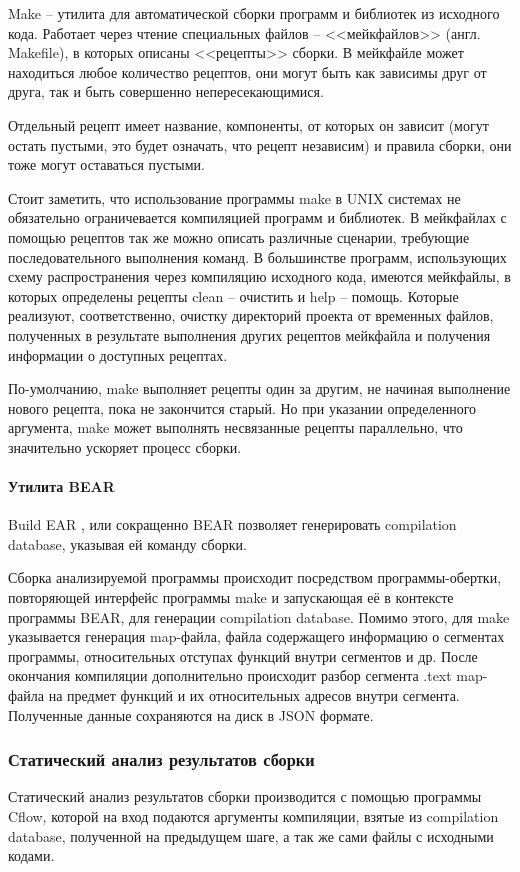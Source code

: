 Make -- утилита для автоматической сборки программ и библиотек из исходного кода.
Работает через чтение специальных файлов -- <<мейкфайлов>> (англ. Makefile), в которых 
описаны <<рецепты>> сборки. В мейкфайле может находиться любое количество рецептов, они могут
быть как зависимы друг от друга, так и быть совершенно непересекающимися.

Отдельный рецепт имеет название, компоненты, от которых он зависит (могут остать пустыми, это будет означать,
что рецепт независим) и правила сборки, они тоже могут оставаться пустыми.

Стоит заметить, что использование программы make в UNIX системах не обязательно ограничевается
компиляцией программ и библиотек. В мейкфайлах с помощью рецептов так же можно описать различные сценарии,
требующие последовательного выполнения команд. В большинстве программ, использующих схему распространения
через компиляцию исходного кода, имеются мейкфайлы, в которых определены рецепты clean -- очистить и help --
помощь. Которые реализуют, соответственно, очистку директорий проекта от временных файлов, полученных в результате
выполнения других рецептов мейкфайла и получения информации о доступных рецептах.

По-умолчанию, make выполняет рецепты один за другим, не начиная выполнение нового рецепта, пока
не закончится старый. Но при указании определенного аргумента, make может выполнять несвязанные рецепты
параллельно, что значительно ускоряет процесс сборки.

\paragraph{Утилита BEAR}\label{sec:ch2/sec2/sub3/sub1/par2}\mbox{}

Build EAR \autocite{bear}, или сокращенно BEAR позволяет генерировать compilation database, указывая ей
команду сборки.

Сборка анализируемой программы происходит посредством программы-обертки, повторяющей интерфейс программы make
и запускающая её в контексте программы BEAR, для генерации compilation database. Помимо этого, для make
указывается генерация map-файла, файла содержащего информацию о сегментах программы,
относительных отступах функций внутри сегментов и др. После окончания компиляции дополнительно
происходит разбор сегмента .text map-файла на предмет функций и их относительных адресов внутри сегмента.
Полученные данные сохраняются на диск в JSON формате.


\subsubsection{Статический анализ результатов сборки}\label{sec:ch2/sec2/sub3/sub2}
Статический анализ результатов сборки производится с помощью программы Cflow, которой на вход
подаются аргументы компиляции, взятые из compilation database, полученной на предыдущем шаге,
а так же сами файлы с исходными кодами.

